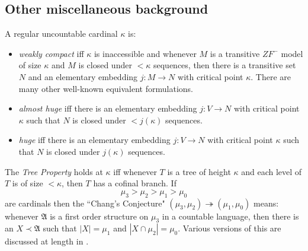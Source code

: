 \documentclass{amsart}
\begin{document}
\subsection{Other miscellaneous background}



A regular uncountable cardinal $\kappa$ is:
\begin{itemize}
 \item \emph{weakly compact} iff $\kappa$ is inaccessible and whenever $M$ is a transitive $ZF^-$ model of size $\kappa$ and $M$ is closed under $<\kappa$ sequences, then there is a transitive set $N$ and an elementary embedding $j: M \to N$ with critical point $\kappa$.  There are many other well-known equivalent formulations.
 \item \emph{almost huge} iff there is an elementary embedding $j: V \to N$ with critical point $\kappa$ such that $N$ is closed under $<j(\kappa)$ sequences.
 \item \emph{huge} iff there is an elementary embedding $j: V \to N$ with critical point $\kappa$ such that $N$ is closed under $j(\kappa)$ sequences.
\end{itemize}

The \emph{Tree Property} holds at $\kappa$ iff whenever $T$ is a tree of height $\kappa$ and each level of $T$ is of size $<\kappa$, then $T$ has a cofinal branch.  If 
\[
\mu_3 > \mu_2 > \mu_1 > \mu_0
\]
are cardinals then the ``Chang's Conjecture" $(\mu_3, \mu_2) \twoheadrightarrow (\mu_1, \mu_0)$ means:  whenever $\mathfrak{A}$ is a first order structure on $\mu_3$ in a countable language, then there is an $X \prec \mathfrak{A}$ such that $|X| = \mu_1$ and $|X \cap \mu_2| = \mu_0$.  Various versions of this are discussed at length in \cite{MattHandbook}.
\end{document}
